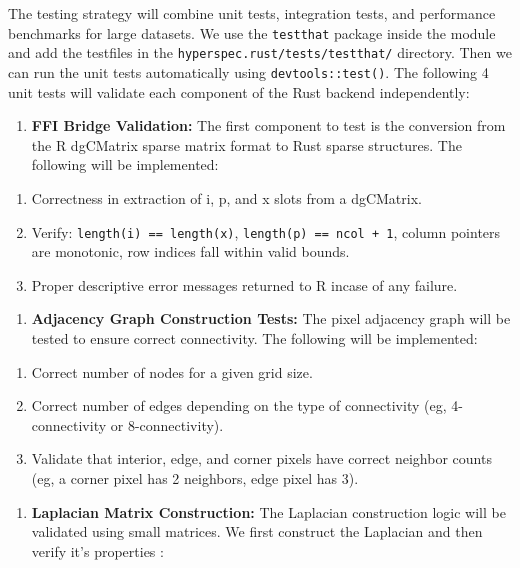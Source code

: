 \documentclass[11pt]{article}
\providecommand{\tightlist}{%
      \setlength{\itemsep}{0pt}\setlength{\parskip}{0pt}}
\begin{document}
\hfill\break
The testing strategy will combine unit tests, integration tests, and
performance benchmarks for large datasets. We use the \texttt{testthat}
package inside the module and add the testfiles in the
\texttt{hyperspec.rust/tests/testthat/} directory. Then we can run the
unit tests automatically using \texttt{devtools::test()}. The following
4 unit tests will validate each component of the Rust backend
independently:

\begin{enumerate}
\def\labelenumi{\arabic{enumi}.}
\tightlist
\item
  \textbf{FFI Bridge Validation:} The first component to test is the
  conversion from the R dgCMatrix sparse matrix format to Rust sparse
  structures. The following will be implemented:
\end{enumerate}

\begin{enumerate}
\def\labelenumi{\roman{enumi}.}
\tightlist
\item
  Correctness in extraction of i, p, and x slots from a dgCMatrix.
\item
  Verify: \texttt{length(i)\ ==\ length(x)},
  \texttt{length(p)\ ==\ ncol\ +\ 1}, column pointers are monotonic, row
  indices fall within valid bounds.
\item
  Proper descriptive error messages returned to R incase of any failure.
\end{enumerate}

\begin{enumerate}
\def\labelenumi{\arabic{enumi}.}
\setcounter{enumi}{1}
\tightlist
\item
  \textbf{Adjacency Graph Construction Tests:} The pixel adjacency graph
  will be tested to ensure correct connectivity. The following will be
  implemented:
\end{enumerate}

\begin{enumerate}
\def\labelenumi{\roman{enumi}.}
\tightlist
\item
  Correct number of nodes for a given grid size.
\item
  Correct number of edges depending on the type of connectivity (eg,
  4-connectivity or 8-connectivity).
\item
  Validate that interior, edge, and corner pixels have correct neighbor
  counts (eg, a corner pixel has 2 neighbors, edge pixel has 3).
\end{enumerate}

\begin{enumerate}
\def\labelenumi{\arabic{enumi}.}
\setcounter{enumi}{2}
\tightlist
\item
  \textbf{Laplacian Matrix Construction:} The Laplacian construction
  logic will be validated using small matrices. We first construct the
  Laplacian and then verify it's properties :
\end{enumerate}
\end{document}

